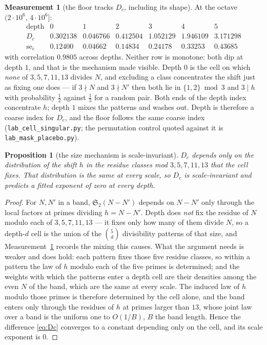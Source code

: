 \documentclass[11pt,a4paper]{article}
\theoremstyle{plain}
\newtheorem{proposition}[theorem]{Proposition}
\theoremstyle{definition}
\newtheorem{measurement}[theorem]{Measurement}
\theoremstyle{remark}
\renewcommand{\SS}{\mathfrak{S}}
\begin{document}
\begin{measurement}[the floor tracks $D_c$, including its shape]%
\label{meas:Dc}
At the octave $(2\cdot10^6,\,4\cdot10^6]$:
\[
\begin{array}{r|cccccc}
 \text{depth} & 0 & 1 & 2 & 3 & 4 & 5\\\hline
 D_c & 0.302138 & 0.046766 & 0.412504 & 1.052129 & 1.946109
   & 3.171298\\
 \mathrm{se}_c & 0.12400 & 0.04662 & 0.14834 & 0.24178 & 0.33253
   & 0.43685
\end{array}
\]
with correlation $0.9805$ across depths. Neither row is monotone: both
dip at depth $1$, and that is the mechanism made visible. Depth $0$ is
the cell on which \emph{none} of $3,5,7,11,13$ divides $N$, and
excluding a class concentrates the shift just as fixing one does ---
if $3\nmid N$ and $3\nmid N'$ then both lie in $\{1,2\}\bmod3$ and
$3\mid h$ with probability $\tfrac12$ against $\tfrac13$ for a random
pair. Both ends of the depth index concentrate $h$; depth $1$ mixes
the patterns and washes out. Depth is therefore a coarse index for
$D_c$, and the floor follows the same coarse index
(\texttt{lab\_cell\_singular.py}; the permutation control quoted
against it is \texttt{lab\_mask\_placebo.py}).
\end{measurement}

\begin{proposition}[the size mechanism is scale-invariant]%
\label{prop:scaleinv}
$D_c$ depends only on the distribution of the shift $h$ in the residue
classes mod $3,5,7,11,13$ that the cell fixes. That distribution is
the same at every scale, so $D_c$ is scale-invariant and predicts a
fitted exponent of zero at every depth.
\end{proposition}

\begin{proof}
For $N,N'$ in a band, $\SS_2(N-N')$ depends on $N-N'$ only through the
local factors at primes dividing $h=N-N'$. Depth does \emph{not} fix
the residue of $N$ modulo each of $3,5,7,11,13$ --- it fixes only how
many of them divide $N$, so a depth-$d$ cell is the union of the
$\binom{5}{d}$ divisibility patterns of that size, and
Measurement~\ref{meas:Dc} records the mixing this causes. What the
argument needs is weaker and does hold: each pattern fixes those five
residue classes, so within a pattern the law of $h$ modulo each of the
five primes is determined; and the weights with which the patterns
enter a depth cell are their densities among the even $N$ of the band,
which are the same at every scale. The induced law of $h$ modulo those
primes is therefore determined by the cell alone, and the band enters
only
through the residues of $h$ at primes larger than $13$, whose joint
law over a band is the uniform one to $O(1/B)$, $B$ the band length.
Hence the
difference \eqref{eq:Dc} converges to a constant depending only on the
cell, and its scale exponent is $0$.
\end{proof}
\end{document}
